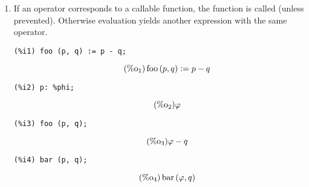 \documentclass[12pt,leqno]{article}
\begin{document}
\begin{enumerate}
\item If an operator corresponds to a callable function,
the function is called (unless prevented).
Otherwise evaluation yields another expression with the same operator.
\begin{verbatim}
(%i1) foo (p, q) := p - q;
\end{verbatim}
\begin{equation}
\tag{$\mathop{\mathrm{\%o}_{1}}$}\mathop{\mathrm{foo}}\left(p, q\right) := p-q
\label{eq:doc-group1-code14-1-1}
\end{equation}
\begin{verbatim}
(%i2) p: %phi;
\end{verbatim}
\begin{equation}
\tag{$\mathop{\mathrm{\%o}_{2}}$}\varphi
\label{eq:doc-group1-code14-2-1}
\end{equation}
\begin{verbatim}
(%i3) foo (p, q);
\end{verbatim}
\begin{equation}
\tag{$\mathop{\mathrm{\%o}_{3}}$}\varphi-q
\label{eq:doc-group1-code14-3-1}
\end{equation}
\begin{verbatim}
(%i4) bar (p, q);
\end{verbatim}
\begin{equation}
\tag{$\mathop{\mathrm{\%o}_{4}}$}\mathop{\mathrm{bar}}\left(\varphi, q\right)
\label{eq:doc-group1-code14-4-1}
\end{equation}



\end{enumerate}
\end{document}
